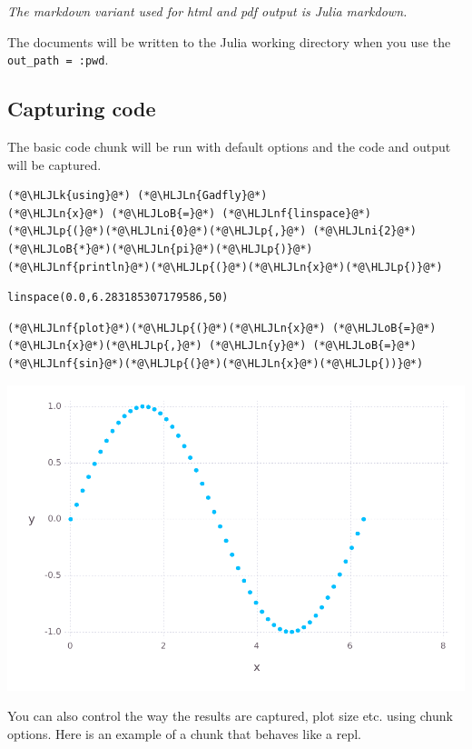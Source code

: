 \documentclass[12pt,a4paper]{article}
\newcommand{\HLJLk}[1]{\textcolor[RGB]{148,91,176}{\textbf{#1}}}
\newcommand{\HLJLn}[1]{#1}
\newcommand{\HLJLnf}[1]{\textcolor[RGB]{66,102,213}{#1}}
\newcommand{\HLJLni}[1]{\textcolor[RGB]{59,151,46}{#1}}
\newcommand{\HLJLoB}[1]{\textcolor[RGB]{102,102,102}{\textbf{#1}}}
\newcommand{\HLJLp}[1]{#1}
\begin{document}
\emph{The markdown variant used for html and pdf output is Julia markdown.}

The documents will be written to the Julia working directory when you use the \verb|out_path = :pwd|.
\subsection{Capturing code}

The basic code chunk will be run with default options and the code and output will be captured.

\begin{lstlisting}
(*@\HLJLk{using}@*) (*@\HLJLn{Gadfly}@*)
(*@\HLJLn{x}@*) (*@\HLJLoB{=}@*) (*@\HLJLnf{linspace}@*)(*@\HLJLp{(}@*)(*@\HLJLni{0}@*)(*@\HLJLp{,}@*) (*@\HLJLni{2}@*)(*@\HLJLoB{*}@*)(*@\HLJLn{pi}@*)(*@\HLJLp{)}@*)
(*@\HLJLnf{println}@*)(*@\HLJLp{(}@*)(*@\HLJLn{x}@*)(*@\HLJLp{)}@*)
\end{lstlisting}


\begin{lstlisting}
linspace(0.0,6.283185307179586,50)
\end{lstlisting}


\begin{lstlisting}
(*@\HLJLnf{plot}@*)(*@\HLJLp{(}@*)(*@\HLJLn{x}@*) (*@\HLJLoB{=}@*) (*@\HLJLn{x}@*)(*@\HLJLp{,}@*) (*@\HLJLn{y}@*) (*@\HLJLoB{=}@*) (*@\HLJLnf{sin}@*)(*@\HLJLp{(}@*)(*@\HLJLn{x}@*)(*@\HLJLp{))}@*)
\end{lstlisting}


\includegraphics{figures/gadfly_md_sample_2_1.pdf}


You can also control the way the results are captured, plot size etc. using chunk options. Here is an example of a chunk that behaves like a repl.
\end{document}
